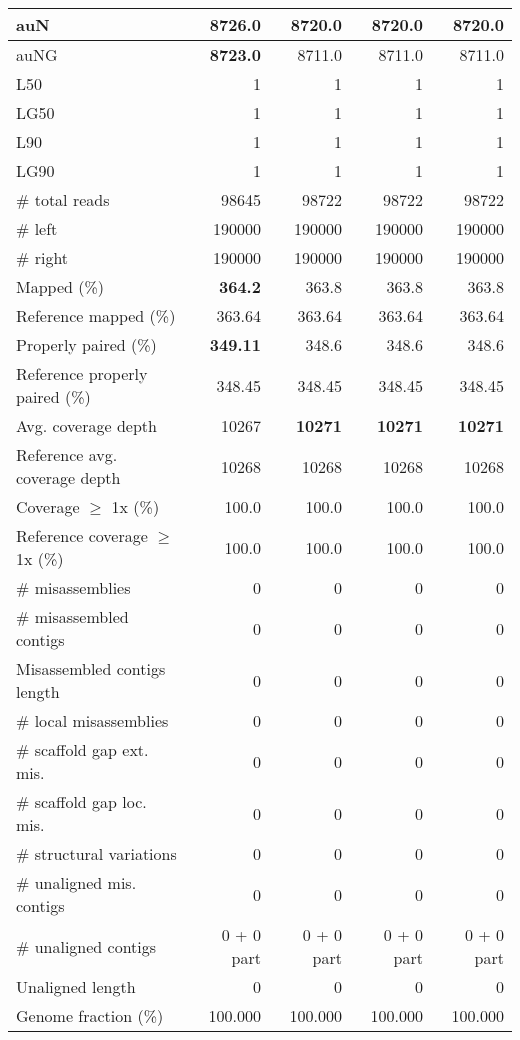 \documentclass[12pt,a4paper]{article}
\begin{document}
\begin{table}[ht]
\begin{center}
\begin{tabular}{|l*{4}{|r}|}
auN & {\bf 8726.0} & 8720.0 & 8720.0 & 8720.0 \\ \hline
auNG & {\bf 8723.0} & 8711.0 & 8711.0 & 8711.0 \\ \hline
L50 & 1 & 1 & 1 & 1 \\ \hline
LG50 & 1 & 1 & 1 & 1 \\ \hline
L90 & 1 & 1 & 1 & 1 \\ \hline
LG90 & 1 & 1 & 1 & 1 \\ \hline
\# total reads & 98645 & 98722 & 98722 & 98722 \\ \hline
\# left & 190000 & 190000 & 190000 & 190000 \\ \hline
\# right & 190000 & 190000 & 190000 & 190000 \\ \hline
Mapped (\%) & {\bf 364.2} & 363.8 & 363.8 & 363.8 \\ \hline
Reference mapped (\%) & 363.64 & 363.64 & 363.64 & 363.64 \\ \hline
Properly paired (\%) & {\bf 349.11} & 348.6 & 348.6 & 348.6 \\ \hline
Reference properly paired (\%) & 348.45 & 348.45 & 348.45 & 348.45 \\ \hline
Avg. coverage depth & 10267 & {\bf 10271} & {\bf 10271} & {\bf 10271} \\ \hline
Reference avg. coverage depth & 10268 & 10268 & 10268 & 10268 \\ \hline
Coverage $\geq$ 1x (\%) & 100.0 & 100.0 & 100.0 & 100.0 \\ \hline
Reference coverage $\geq$ 1x (\%) & 100.0 & 100.0 & 100.0 & 100.0 \\ \hline
\# misassemblies & 0 & 0 & 0 & 0 \\ \hline
\# misassembled contigs & 0 & 0 & 0 & 0 \\ \hline
Misassembled contigs length & 0 & 0 & 0 & 0 \\ \hline
\# local misassemblies & 0 & 0 & 0 & 0 \\ \hline
\# scaffold gap ext. mis. & 0 & 0 & 0 & 0 \\ \hline
\# scaffold gap loc. mis. & 0 & 0 & 0 & 0 \\ \hline
\# structural variations & 0 & 0 & 0 & 0 \\ \hline
\# unaligned mis. contigs & 0 & 0 & 0 & 0 \\ \hline
\# unaligned contigs & 0 + 0 part & 0 + 0 part & 0 + 0 part & 0 + 0 part \\ \hline
Unaligned length & 0 & 0 & 0 & 0 \\ \hline
Genome fraction (\%) & 100.000 & 100.000 & 100.000 & 100.000 \\ \hline

\end{tabular}
\end{center}
\end{table}
\end{document}
